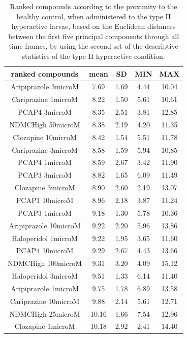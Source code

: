 \documentclass[a4paper,12pt]{article}
\begin{document}
\begin{table}[h!]\tiny
\centering
\caption{Ranked compounds according to the proximity to the healthy control, when administered to the type II hyperactive larvae, based on the Euclidean distances between the first five principal components through all time frames, by using the second set of the descriptive statistics of the type II hyperactive condition.}
\begin{tabular}{|c|c|c|c|c|}
\hline
ranked compounds             & mean & SD   & MIN  & MAX   \\ \hline
Aripiprazole 3microM  & 7.69  & 1.69 & 4.44 & 10.04 \\ \hline
Cariprazine 1microM   & 8.22  & 1.50  & 5.61 & 10.61 \\ \hline
PCAP4 3microM       & 8.35  & 2.51 & 3.81 & 12.85 \\ \hline
NDMCHigh 50microM     & 8.38  & 2.19 & 4.20  & 11.35 \\ \hline
Clozapine 10microM    & 8.42  & 1.54 & 5.51 & 11.78 \\ \hline
Cariprazine 3microM   & 8.58  & 1.59 & 5.94 & 10.85 \\ \hline
PCAP4 1microM       & 8.59  & 2.67 & 3.42 & 11.90  \\ \hline
PCAP3 3microM       & 8.82  & 1.65 & 6.09 & 11.49 \\ \hline
Clozapine 3microM     & 8.90   & 2.60  & 2.19 & 13.07 \\ \hline
PCAP1 10microM        & 8.96  & 2.18 & 3.87 & 11.24 \\ \hline
PCAP3 1microM       & 9.18  & 1.30  & 5.78 & 10.36 \\ \hline
Aripiprazole 10microM & 9.22  & 2.20  & 5.96 & 13.86 \\ \hline
Haloperidol 1microM   & 9.22  & 1.95 & 3.65 & 11.60  \\ \hline
PCAP4 10microM      & 9.29  & 2.67 & 4.43 & 13.66 \\ \hline
NDMCHigh 100microM    & 9.31  & 3.20  & 4.09 & 15.12 \\ \hline
Haloperidol 3microM   & 9.51  & 1.33 & 6.14 & 11.40  \\ \hline
Aripiprazole 1microM  & 9.75  & 1.78 & 6.89 & 13.58 \\ \hline
Cariprazine 10microM  & 9.88  & 2.14 & 5.61 & 12.71 \\ \hline
NDMCHigh 25microM     & 10.16 & 1.66 & 7.54 & 12.96 \\ \hline
Clozapine 1microM     & 10.18 & 2.92 & 2.41 & 14.40  \\ \hline

\end{tabular}
\end{table}
\end{document}
